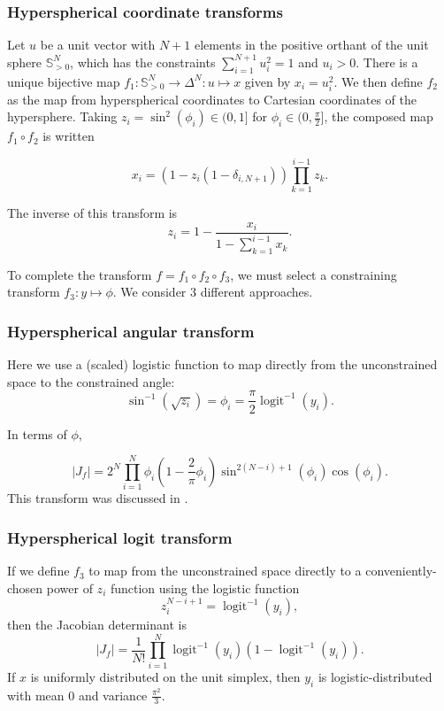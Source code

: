 \documentclass[11pt]{article}
\begin{document}
\subsubsection{Hyperspherical coordinate transforms}

Let $u$ be a unit vector with $N+1$ elements in the positive orthant of the unit sphere $\mathbb{S}_{>0}^N$, which has the constraints $\sum_{i=1}^{N+1} u_i^2 = 1$ and $u_i > 0$.
There is a unique bijective map $f_1\colon \mathbb{S}_{>0}^N \to \Delta^N \colon u \mapsto x$ given by $x_i = u_i^2$.
We then define $f_2$ as the map from hyperspherical coordinates to Cartesian coordinates of the hypersphere.
Taking $z_i = \sin^2(\phi_i) \in (0, 1]$ for $\phi_i \in (0, \frac{\pi}{2}]$, the composed map $f_1 \circ f_2$ is written

\[
  x_i = (1 - z_i (1 - \delta_{i,N+1})) \prod_{k=1}^{i-1} z_k.
\]

The inverse of this transform is
$$z_i = 1 - \frac{x_i}{1 - \sum_{k=1}^{i - 1} x_k}.$$

To complete the transform $f = f_1 \circ f_2 \circ f_3$, we must select a constraining transform $f_3: y \mapsto \phi$.
We consider 3 different approaches.

\subsubsection{Hyperspherical angular transform}

Here we use a (scaled) logistic function to map directly from the unconstrained space to the constrained angle:
$$\sin^{-1}(\sqrt{z_i}) = \phi_i = \frac{\pi}{2} \operatorname{logit}^{-1} (y_i).$$

In terms of $\phi$,

$$
|J_f| = 2^N \prod_{i=1}^N \phi_i \left(1 - \frac{2}{\pi} \phi_i\right) \sin^{2(N-i)+1}(\phi_i) \cos(\phi_i).
$$
This transform was discussed in \cite{betancourt2012cruising}.

\subsubsection{Hyperspherical logit transform}

If we define $f_3$ to map from the unconstrained space directly to a conveniently-chosen power of $z_i$ function using the logistic function 
$$z_i^{N-i+1} = \operatorname{logit}^{-1} (y_i),$$
then the Jacobian determinant is
$$
|J_f| = \frac{1}{N!} \prod_{i=1}^N \operatorname{logit}^{-1}(y_i) (1 - \operatorname{logit}^{-1}(y_i)).
$$
If $x$ is uniformly distributed on the unit simplex, then $y_i$ is logistic-distributed with mean 0 and variance $\frac{\pi^2}{3}$.
\end{document}
